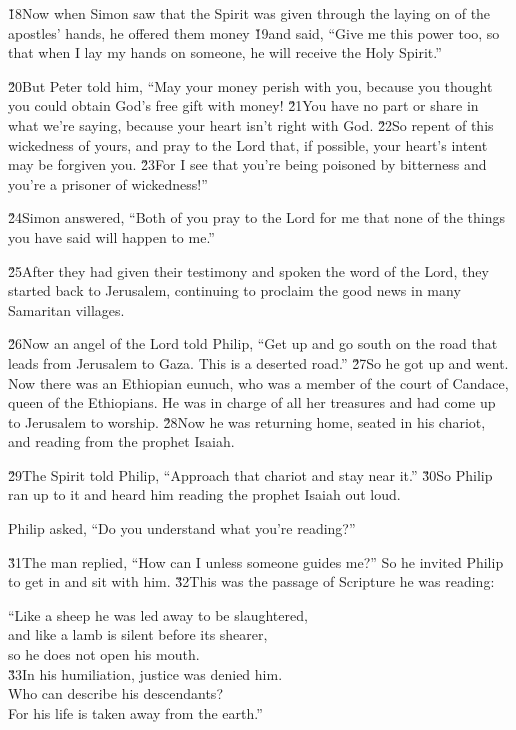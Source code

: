 \v{18}Now when Simon saw that the Spirit was given through the laying on of the apostles' hands, he offered them money \v{19}and said, ``Give me this power too, so that when I lay my hands on someone, he will receive the Holy Spirit.''

\v{20}But Peter told him, ``May your money perish with you, because you thought you could obtain God's free gift with money! \v{21}You have no part or share in what we're saying, because your heart isn't right with God. \v{22}So repent of this wickedness of yours, and pray to the Lord that, if possible, your heart's intent may be forgiven you. \v{23}For I see that you're being poisoned by bitterness and you're a prisoner of wickedness!''

\v{24}Simon answered, ``Both of you pray to the Lord for me that none of the things you have said will happen to me.''

\v{25}After they had given their testimony and spoken the word of the Lord, they started back to Jerusalem, continuing to proclaim the good news in many Samaritan villages.

\v{26}Now an angel of the Lord told Philip, ``Get up and go south on the road that leads from Jerusalem to Gaza. This is a deserted road.'' \v{27}So he got up and went. Now there was an Ethiopian eunuch, who was a member of the court of Candace, queen of the Ethiopians. He was in charge of all her treasures and had come up to Jerusalem to worship. \v{28}Now he was returning home, seated in his chariot, and reading from the prophet Isaiah.

\v{29}The Spirit told Philip, ``Approach that chariot and stay near it.'' \v{30}So Philip ran up to it and heard him reading the prophet Isaiah out loud.

Philip asked, ``Do you understand what you're reading?''

\v{31}The man replied, ``How can I unless someone guides me?'' So he invited Philip to get in and sit with him. \v{32}This was the passage of Scripture he was reading:

\begin{poetry}
\poeml ``Like a sheep he was led away to be slaughtered, \\
\poemll    and like a lamb is silent before its shearer, \\
\poemlll       so he does not open his mouth. \\
\poeml \v{33}In his humiliation, justice was denied him. \\
\poemll    Who can describe his descendants? \\
\poemlll       For his life is taken away from the earth.''
\end{poetry}

